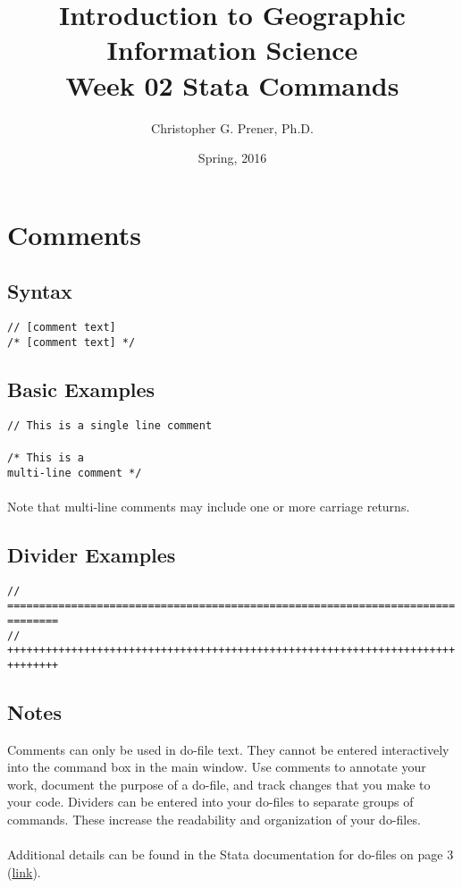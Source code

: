 \documentclass[letterpaper,11pt]{article}
\title{Introduction to Geographic Information Science \\ \large Week 02 Stata Commands}
\author{Christopher G. Prener, Ph.D.}
\date{Spring, 2016}
\begin{document}
\maketitle %
\tableofcontents
\newpage
\section{Comments}
\subsection{Syntax}
\texttt{{\color{Green}// [comment text]}}\\
\texttt{{\color{Green}/* [comment text] */}}\\

\subsection{Basic Examples}
\texttt{{\color{Green}// This is a single line comment}}\\
\\
\texttt{{\color{Green}/* This is a \\ multi-line comment */}}\\
\\
Note that multi-line comments may include one or more carriage returns.\\
\subsection{Divider Examples}
\texttt{{\color{Green}// ==============================================================================}}\\
\texttt{{\color{Green}// 
++++++++++++++++++++++++++++++++++++++++++++++++++++++++++++++++++++++++++++++}}\\

\subsection{Notes}
Comments can only be used in do-file text. They cannot be entered interactively into the command box in the main window. Use comments to annotate your work, document the purpose of a do-file, and track changes that you make to your code. Dividers can be entered into your do-files to separate groups of commands. These increase the readability and organization of your do-files. \\
\\
Additional details can be found in the Stata documentation for do-files on page 3 (\href{http://www.stata.com/manuals14/u16.pdf}{link}).\\
\newpage
\end{document}
